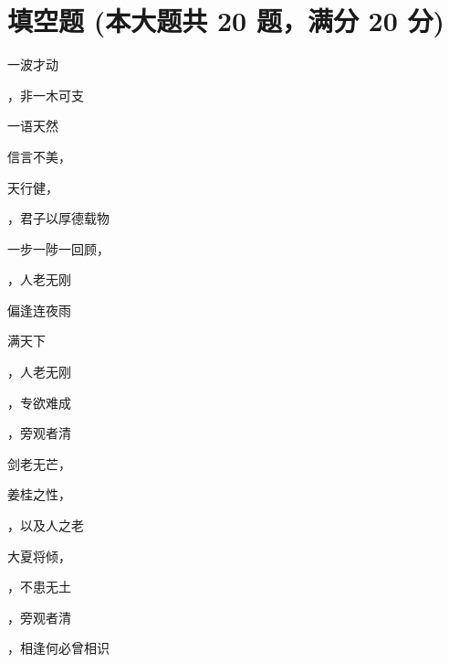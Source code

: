 \documentclass[12pt, a4paper, addpoints]{exam}
\begin{document}
\section{\normalsize{填空题 (本大题共 20 题，满分 20 分)}}
\hspace{1.5cm}
\begin{multicols}{2}
\begin{questions}
\question[1] 一波才动\uline{\qquad\qquad\qquad}

\question[1] \uline{\qquad\qquad\qquad}，非一木可支

\question[1] 一语天然\uline{\qquad\qquad\qquad}

\question[1] 信言不美，\uline{\qquad\qquad\qquad}

\question[1] 天行健，\uline{\qquad\qquad\qquad}

\question[1] \uline{\qquad\qquad\qquad}，君子以厚德载物

\question[1] 一步一陟一回顾，\uline{\qquad\qquad\qquad}

\question[1] \uline{\qquad\qquad\qquad}，人老无刚

\question[1] \uline{\qquad\qquad\qquad}偏逢连夜雨

\question[1] \uline{\qquad\qquad\qquad}满天下

\question[1] \uline{\qquad\qquad\qquad}，人老无刚

\question[1] \uline{\qquad\qquad\qquad}，专欲难成

\question[1] \uline{\qquad\qquad\qquad}，旁观者清

\question[1] 剑老无芒，\uline{\qquad\qquad\qquad}

\question[1] 姜桂之性，\uline{\qquad\qquad\qquad}

\question[1] \uline{\qquad\qquad\qquad}，以及人之老

\question[1] 大夏将倾，\uline{\qquad\qquad\qquad}

\question[1] \uline{\qquad\qquad\qquad}，不患无土

\question[1] \uline{\qquad\qquad\qquad}，旁观者清

\question[1] \uline{\qquad\qquad\qquad}，相逢何必曾相识

\end{questions}
\end{multicols}
\end{document}
